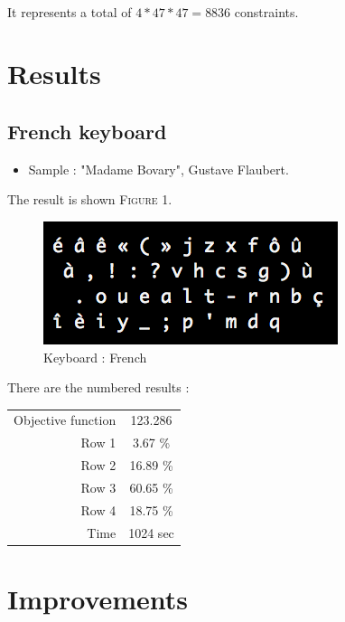 \documentclass[a4paper,titlepage]{article}
\begin{document}
\paragraph{}
It represents a total of $4 * 47 * 47 = 8836$ constraints.

\section{Results}

	\subsection{French keyboard}

\begin{itemize}
	\item Sample : "Madame Bovary", Gustave Flaubert.
\end{itemize}
The result is shown \textsc{Figure} 1.
\begin{figure}[h]
	\centering
	\includegraphics[scale=1]{images/Francais.png}
	\caption{Keyboard : French}
\end{figure}

There are the numbered results : 
\begin{center}
	\begin{tabular}{r|c}
		Objective function & 123.286\\
		Row 1 & 3.67 \%\\
		Row 2 & 16.89 \%\\
		Row 3 & 60.65 \%\\
		Row 4 & 18.75 \%\\
		Time & 1024 sec
	\end{tabular}
\end{center}


\section{Improvements}

\newpage
\end{document}
